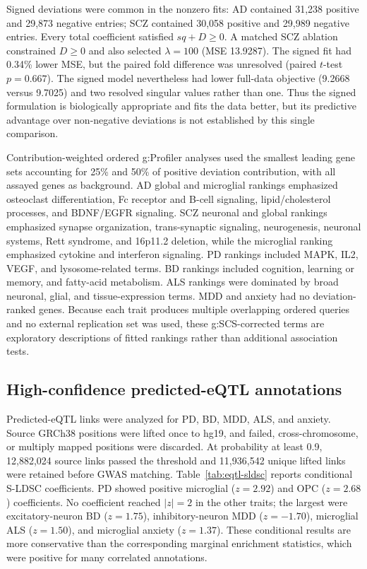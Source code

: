 \documentclass[11pt]{article}
\begin{document}
Signed deviations were common in the nonzero fits: AD contained 31,238 positive and 29,873 negative entries; SCZ contained 30,058 positive and 29,989 negative entries. Every total coefficient satisfied $s q+D\ge0$. A matched SCZ ablation constrained $D\ge0$ and also selected $\lambda=100$ (MSE 13.9287). The signed fit had 0.34\% lower MSE, but the paired fold difference was unresolved (paired $t$-test $p=0.667$). The signed model nevertheless had lower full-data objective (9.2668 versus 9.7025) and two resolved singular values rather than one. Thus the signed formulation is biologically appropriate and fits the data better, but its predictive advantage over non-negative deviations is not established by this single comparison.

Contribution-weighted ordered g:Profiler analyses used the smallest leading gene sets accounting for 25\% and 50\% of positive deviation contribution, with all assayed genes as background. AD global and microglial rankings emphasized osteoclast differentiation, Fc receptor and B-cell signaling, lipid/cholesterol processes, and BDNF/EGFR signaling. SCZ neuronal and global rankings emphasized synapse organization, trans-synaptic signaling, neurogenesis, neuronal systems, Rett syndrome, and 16p11.2 deletion, while the microglial ranking emphasized cytokine and interferon signaling. PD rankings included MAPK, IL2, VEGF, and lysosome-related terms. BD rankings included cognition, learning or memory, and fatty-acid metabolism. ALS rankings were dominated by broad neuronal, glial, and tissue-expression terms. MDD and anxiety had no deviation-ranked genes. Because each trait produces multiple overlapping ordered queries and no external replication set was used, these g:SCS-corrected terms are exploratory descriptions of fitted rankings rather than additional association tests.

\subsection{High-confidence predicted-eQTL annotations}

Predicted-eQTL links were analyzed for PD, BD, MDD, ALS, and anxiety. Source GRCh38 positions were lifted once to hg19, and failed, cross-chromosome, or multiply mapped positions were discarded. At probability at least 0.9, 12,882,024 source links passed the threshold and 11,936,542 unique lifted links were retained before GWAS matching. Table~\ref{tab:eqtl-sldsc} reports conditional S-LDSC coefficients. PD showed positive microglial ($z=2.92$) and OPC ($z=2.68$) coefficients. No coefficient reached $|z|=2$ in the other traits; the largest were excitatory-neuron BD ($z=1.75$), inhibitory-neuron MDD ($z=-1.70$), microglial ALS ($z=1.50$), and microglial anxiety ($z=1.37$). These conditional results are more conservative than the corresponding marginal enrichment statistics, which were positive for many correlated annotations.
\end{document}
